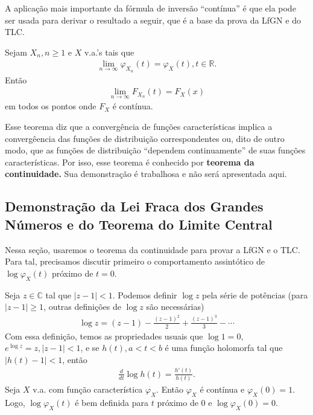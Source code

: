 \documentclass[../Notas.tex]{subfiles}
\begin{document}
A aplicação mais importante da fórmula de inversão ``contínua'' é que ela pode ser usada para derivar o resultado a seguir, que é a base da prova da LfGN e do TLC.

\begin{theorem}[Continuidade]
Sejam $X_n, n\geq 1$ e $X$ v.a.'s tais que
\begin{align*}
    \lim_{n\to\infty} \varphi_{X_n}(t) = \varphi_X(t), t\in\mathbb{R}.
\end{align*}
Então
\begin{align*}
    \lim_{n\to\infty} F_{X_n}(t) = F_X(x)
\end{align*}
em todos os pontos onde $F_X$ é contínua.
\end{theorem}

Esse teorema diz que a convergência de funções características implica a convergêencia das funções de distribuição correspondentes ou, dito de outro modo, que as funções de distribuição ``dependem continuamente'' de suas funções características. Por isso, esse teorema é conhecido por \textbf{teorema da continuidade.} Sua demonstração é trabalhosa e não será apresentada aqui.


\subsection{Demonstração da Lei Fraca dos Grandes Números e do Teorema do Limite Central}
Nessa seção, usaremos o teorema da continuidade para provar a LfGN e o TLC. Para tal, precisamos discutir primeiro o comportamento assintótico de $\log\varphi_X(t)$ próximo de $t=0$. 

Seja $z\in\mathbb{C}$ tal que $|z-1| < 1$. Podemos definir $\log z$ pela série de potências (para $|z-1|\geq 1$, outras definições de $\log z$ são necessárias)
\begin{align*}
    \log z = (z-1) - \frac{(z-1)^2}{2} + \frac{(z-1)^3}{3} - \cdots 
\end{align*}
Com essa definição, temos as propriedades usuais que $\log 1 = 0$, $e^{\log z} = z, |z-1|<1$, e se $h(t), a < t < b$ é uma função holomorfa tal que $|h(t) - 1| < 1$, então
\begin{align*}
    \frac{d}{dt}\log h(t) = \frac{h'(t)}{h(t)}.
\end{align*}
Seja $X$ v.a. com função característica $\varphi_X$. Então $\varphi_X$ é contínua e $\varphi_X(0) = 1$. Logo, $\log\varphi_X(t)$ é bem definida para $t$ próximo de 0 e $\log\varphi_X(0) = 0$.
\end{document}
